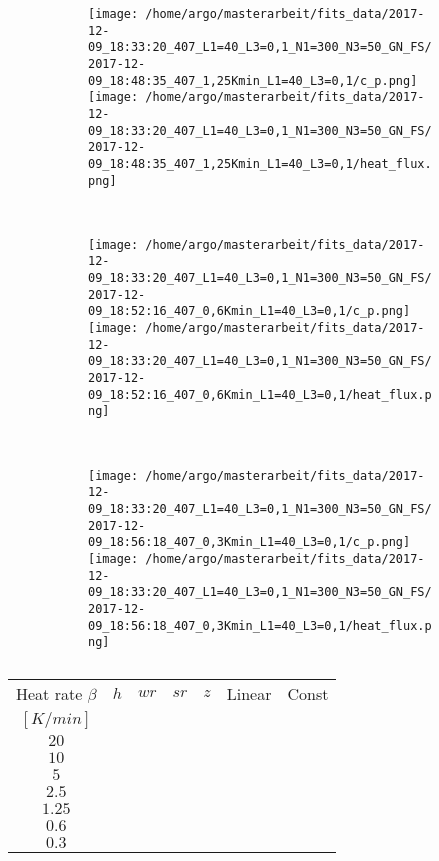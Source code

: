 \documentclass{scrartcl}[12pt, halfparskip]
\numberwithin{equation}{section}
\numberwithin{figure}{section}
\numberwithin{table}{section}
\begin{document}
\begin{figure}[H]
	\begin{subfigure}{1.\textwidth}
		\texttt{[image: /home/argo/masterarbeit/fits\_data/2017-12-09\_18:33:20\_407\_L1=40\_L3=0,1\_N1=300\_N3=50\_GN\_FS/2017-12-09\_18:48:35\_407\_1,25Kmin\_L1=40\_L3=0,1/c\_p.png]}
		\texttt{[image: /home/argo/masterarbeit/fits\_data/2017-12-09\_18:33:20\_407\_L1=40\_L3=0,1\_N1=300\_N3=50\_GN\_FS/2017-12-09\_18:48:35\_407\_1,25Kmin\_L1=40\_L3=0,1/heat\_flux.png]}
	\end{subfigure} \\[1ex]
	
	\begin{subfigure}{1.\textwidth}
		\texttt{[image: /home/argo/masterarbeit/fits\_data/2017-12-09\_18:33:20\_407\_L1=40\_L3=0,1\_N1=300\_N3=50\_GN\_FS/2017-12-09\_18:52:16\_407\_0,6Kmin\_L1=40\_L3=0,1/c\_p.png]}
		\texttt{[image: /home/argo/masterarbeit/fits\_data/2017-12-09\_18:33:20\_407\_L1=40\_L3=0,1\_N1=300\_N3=50\_GN\_FS/2017-12-09\_18:52:16\_407\_0,6Kmin\_L1=40\_L3=0,1/heat\_flux.png]}
	\end{subfigure} \\[1ex]
	
	\begin{subfigure}{1.\textwidth}
		\texttt{[image: /home/argo/masterarbeit/fits\_data/2017-12-09\_18:33:20\_407\_L1=40\_L3=0,1\_N1=300\_N3=50\_GN\_FS/2017-12-09\_18:56:18\_407\_0,3Kmin\_L1=40\_L3=0,1/c\_p.png]}
		\texttt{[image: /home/argo/masterarbeit/fits\_data/2017-12-09\_18:33:20\_407\_L1=40\_L3=0,1\_N1=300\_N3=50\_GN\_FS/2017-12-09\_18:56:18\_407\_0,3Kmin\_L1=40\_L3=0,1/heat\_flux.png]}
	\end{subfigure}
	\caption{}
	\label{fig:optim_c_p_heat_flux_FS_2}
\end{figure}




\begin{table}[H]
	\centering
	\begin{tabular}{| c | c | c | c | c | c | c |} \hline
		Heat rate $\beta$ & $h$ & $wr$ & $sr$ & $z$ & Linear & Const \\ 
		$[K/min]$ & & & & & & \\ \hline
		$20$ & & & & & & \\
		$10$ & & & & & &  \\
		$5$ & & & & & & \\
		$2.5$ & & & & & & \\
		$1.25$ & & & & & & \\
		$0.6$ & & & & & & \\
		$0.3$ & & & & & & \\ \hline
	\end{tabular}
	\caption{}
	\label{tab:parameter_table_FS}
\end{table}
\end{document}
